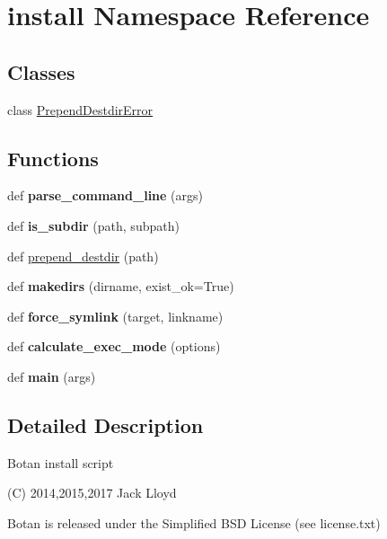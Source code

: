 \hypertarget{namespaceinstall}{}\section{install Namespace Reference}
\label{namespaceinstall}
\subsection*{Classes}
\begin{DoxyCompactItemize}
\item 
class \mbox{\hyperlink{classinstall_1_1_prepend_destdir_error}{Prepend\+Destdir\+Error}}
\end{DoxyCompactItemize}
\subsection*{Functions}
\begin{DoxyCompactItemize}
\item 
\mbox{\label{namespaceinstall_a41193de32d34e4ebae87d816acaba7ab}} 
def {\bfseries parse\+\_\+command\+\_\+line} (args)
\item 
\mbox{\label{namespaceinstall_a447277c3d3ebc49ff775b056333fc550}} 
def {\bfseries is\+\_\+subdir} (path, subpath)
\item 
def \mbox{\hyperlink{namespaceinstall_a7d13e721d8f29c6b97f38106bd003838}{prepend\+\_\+destdir}} (path)
\item 
\mbox{\label{namespaceinstall_a017f91ce2adc0f3f9124a38b6ba03ec0}} 
def {\bfseries makedirs} (dirname, exist\+\_\+ok=True)
\item 
\mbox{\label{namespaceinstall_a0abd2f3f546ade38f94839f8d75b34e9}} 
def {\bfseries force\+\_\+symlink} (target, linkname)
\item 
\mbox{\label{namespaceinstall_a883bff562b1c859d772f4450648220b9}} 
def {\bfseries calculate\+\_\+exec\+\_\+mode} (options)
\item 
\mbox{\label{namespaceinstall_ac41460ff719d978363fac9b8ab449b91}} 
def {\bfseries main} (args)
\end{DoxyCompactItemize}


\subsection{Detailed Description}
\begin{DoxyVerb}Botan install script

(C) 2014,2015,2017 Jack Lloyd

Botan is released under the Simplified BSD License (see license.txt)
\end{DoxyVerb}
 

